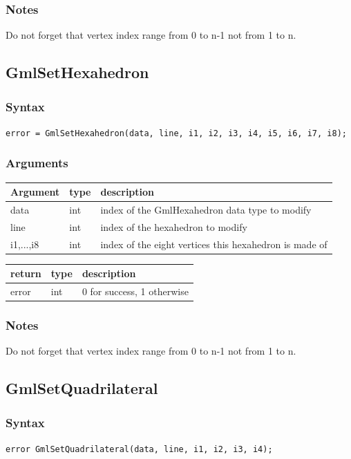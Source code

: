 \documentclass[a4paper,12pt]{article}
\begin{document}
\subsubsection*{Notes}
Do not forget that vertex index range from 0 to n-1 not from 1 to n.


\subsection{GmlSetHexahedron}
\subsubsection*{Syntax}
{\tt error = GmlSetHexahedron(data, line, i1, i2, i3, i4, i5, i6, i7, i8);}
\subsubsection*{Arguments}

\begin{tabular}{|m{2cm}|m{1.5cm}|m{10.5cm}|}
\hline
Argument   & type   & description \\
\hline
data       & int    & index of the GmlHexahedron data type to modify \\
\hline
line       & int    & index of the hexahedron to modify \\
\hline
i1,...,i8  & int    & index of the eight vertices this hexahedron is made of \\
\hline
\end{tabular}

\medskip

\begin{tabular}{|m{2cm}|m{1.5cm}|m{10.5cm}|}
\hline
return     & type   & description \\
\hline
error      & int    & 0 for success, 1 otherwise \\
\hline
\end{tabular}
\subsubsection*{Notes}
Do not forget that vertex index range from 0 to n-1 not from 1 to n.


\subsection{GmlSetQuadrilateral}
\subsubsection*{Syntax}
{\tt error GmlSetQuadrilateral(data, line, i1, i2, i3, i4);}
\end{document}
